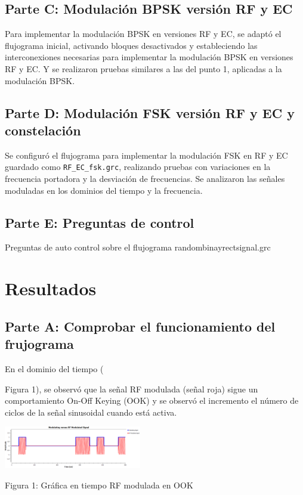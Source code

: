 \documentclass{journal}[IEEEtran, twocolumn]             %
\begin{document}
\begin{multicols}{2}
\subsection{Parte C: Modulación BPSK versión RF y EC}

Para implementar la modulación BPSK en versiones RF y EC, se adaptó el flujograma inicial, activando bloques desactivados y estableciendo las interconexiones necesarias para implementar la modulación BPSK en versiones RF y EC. Y se realizaron pruebas similares a las del punto 1, aplicadas a la modulación BPSK.

\subsection{Parte D: Modulación FSK versión RF y EC y constelación}
Se configuró el flujograma para implementar la modulación FSK en RF y EC guardado como \texttt{RF\_EC\_fsk.grc}, realizando pruebas con variaciones en la frecuencia portadora y la desviación de frecuencias. Se analizaron las señales moduladas en los dominios del tiempo y la frecuencia.

\subsection{Parte E: Preguntas de control}
Preguntas de auto control sobre el flujograma randombinayrectsignal.grc
    
\section{Resultados}
\subsection{Parte A: Comprobar el funcionamiento del frujograma}


En el dominio del tiempo  ({Figura 1), se observó que la señal RF modulada (señal roja) sigue un comportamiento On-Off Keying (OOK) y se observó el incremento el número de ciclos de la señal sinusoidal cuando está activa.\cite{OOK}


    \begin{center}
    \includegraphics[width=0.45\textwidth]{figs/F1.png}
    \caption{Figura 1: Gráfica en tiempo RF modulada en OOK}
    \label{fig:1}
    \end{center}



}
\end{multicols}
\end{document}
